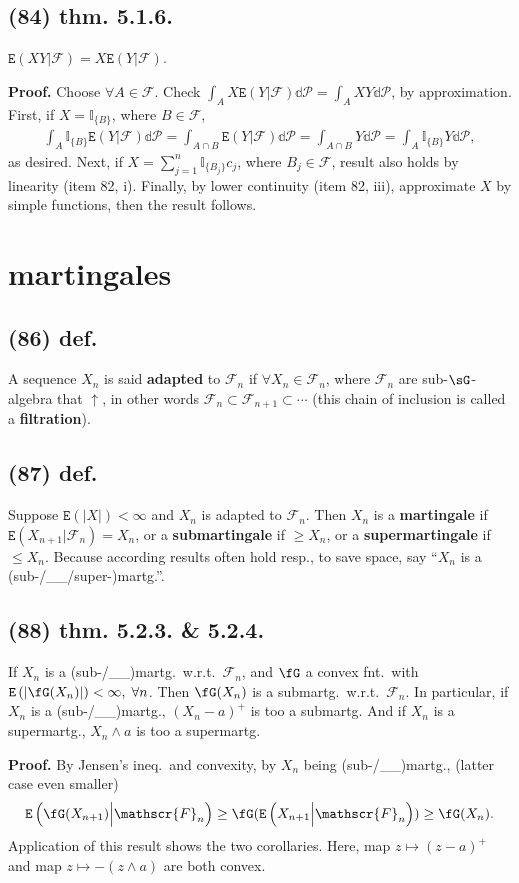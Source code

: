 \documentclass[12pt]{article}
\newcommand{\oo}\infty%
\newcommand{\Ev}\forall%
\newcommand{\dd}{ \BF{d} }%
\newcommand{\Rb}[1]{ \left( #1 \right) }%
\newcommand{\BF}[1]{ \mathbb{#1} }%
\newcommand{\CF}[1]{ \mathcal{#1} }%
\newcommand{\SF}[1]{ \mathscr{#1} }%
\newcommand{\Ss}[1]{\textsf{\bfseries{#1}}}%
\newcommand{\Tw}[1]{\texttt{#1}}%
\newcommand{\EqGo}[1]{ \begin{gather*}{#1}\end{gather*} } %
\newcommand{\E}[1]{ \Tw{E}\Rb{#1} }%
\newcommand{\I}[1]{ \BF{I}_{\{#1\}} }%
\begin{document}
\subsection*{(84) thm. 5.1.6.} \(\E{XY \Big| \SF{F}} =X\E{Y \Big| \SF{F}}\). \par
\Ss{Proof.} Choose \(\Ev A \in \SF{F}\). 
Check \(\int_A X \E{Y \Big| \SF{F}} \dd \CF{P} =\int_A XY \dd \CF{P}\), by approximation. 
First, if \(X =\I{B}\), where \(B \in \SF{F}\), \EqGo{
 \int_A \I{B} \E{Y \Big| \SF{F}} \dd \CF{P}
 =\int_{A \cap B} \E{Y \Big| \SF{F}} \dd \CF{P}
 =\int_{A \cap B} Y \dd \CF{P}
 =\int_A \I{B} Y \dd \CF{P},
} as desired. Next, if \(X =\sum_{j=1}^n \I{B_j} c_j\), where \(B_j \in \SF{F}\), result also holds by linearity (item 82, i). 
Finally, by lower continuity (item 82, iii), approximate \(X\) by simple functions, then the result follows. 

\section{martingales}
\subsection*{(86) def.}  A sequence \(X_n\) is said \Ss{adapted} to \(\SF{F}_n\) if \(\Ev X_n \in \SF{F}_n\), where \(\SF{F}_n\) are sub-\(\sG\)-algebra that \(\uparrow\), in other words \(\SF{F}_n \subset \SF{F}_{n+1} \subset\dotsb\) (this chain of inclusion is called a \Ss{filtration}). 

\subsection*{(87) def.} Suppose \(\E{|X|} <\oo\) and \(X_n\) is adapted to \(\SF{F}_n\). 
Then \(X_n\) is a \Ss{martingale} if \(\E{X_{n+1} \Big| \SF{F}_n} =X_n\), 
or a \Ss{submartingale} if \(\geq X_n\), 
or a \Ss{supermartingale} if \(\leq X_n\). 
Because according results often hold resp., to save space, say ``\(X_n\) is a (sub-/\_\_/super-)martg.''.

\subsection*{(88) thm. 5.2.3. \& 5.2.4.} If \(X_n\) is a (sub-/\_\_)martg.\ w.r.t.\ \(\SF{F}_n\), and \(\fG\) a convex fnt.\ with \(\E{|\fG(X_n)|} <\oo,\; \Ev n\). 
Then \(\fG(X_n)\) is a submartg.\ w.r.t.\ \(\SF{F}_n\). 
In particular, if \(X_n\) is a (sub-/\_\_)martg., \((X_n -a)^+\) is too a submartg. 
And if \(X_n\) is a supermartg., \(X_n \land a\) is too a supermartg. \par
\Ss{Proof.} By Jensen's ineq.\ and convexity, by \(X_n\) being (sub-/\_\_)martg., (latter case even smaller) \EqGo{
 \E{\fG(X_{n+1}) \Big| \SF{F}_n} 
 \geq \fG(\E{X_{n+1} \Big| \SF{F}_n}) 
 \geq \fG(X_n).
} \indent Application of this result shows the two corollaries. Here, map \(z \mapsto (z-a)^+\) and map \(z \mapsto -(z \land a)\) are both convex. 
\end{document}
